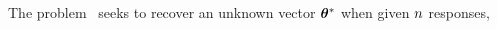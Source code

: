 %
%
The \onebitcs problem~\cite{boufounos20081} seeks to recover an unknown vector \(  \thetaStar  \) when given \(  n  \) responses,
